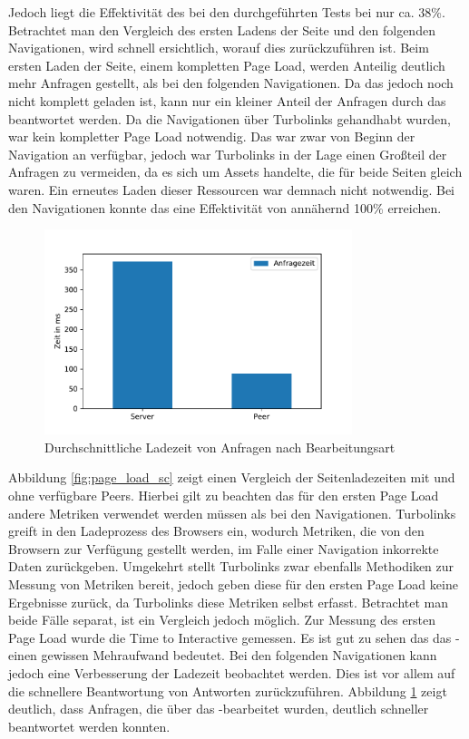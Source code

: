 Jedoch liegt die Effektivität des \cdn bei den durchgeführten Tests bei nur ca. 38\%. Betrachtet man den Vergleich des ersten Ladens der Seite und den folgenden Navigationen, wird schnell ersichtlich, worauf dies zurückzuführen ist. Beim ersten Laden der Seite, einem kompletten Page Load, werden Anteilig deutlich mehr Anfragen gestellt, als bei den folgenden Navigationen. Da das \cdn jedoch noch nicht komplett geladen ist, kann nur ein kleiner Anteil der Anfragen durch das \cdn beantwortet werden. Da die Navigationen über Turbolinks gehandhabt wurden, war kein kompletter Page Load notwendig. Das \cdn war zwar von Beginn der Navigation an verfügbar, jedoch war Turbolinks in der Lage einen Großteil der Anfragen zu vermeiden, da es sich um Assets handelte, die für beide Seiten gleich waren. Ein erneutes Laden dieser Ressourcen war demnach nicht notwendig. Bei den Navigationen konnte das \cdn eine Effektivität von annähernd 100\% erreichen. 

\begin{figure}[!h]
	\centering
	\includegraphics[width=0.8\textwidth]{figures/request_load}
	\caption[Durchschnittliche Ladezeit von Anfragen nach Bearbeitungsart]{Durchschnittliche Ladezeit von Anfragen nach Bearbeitungsart}
	\label{fig:request_load}
\end{figure}

Abbildung \ref{fig:page_load_sc} zeigt einen Vergleich der Seitenladezeiten mit und ohne verfügbare Peers. Hierbei gilt zu beachten das für den ersten Page Load andere Metriken verwendet werden müssen als bei den Navigationen. Turbolinks greift in den Ladeprozess des Browsers ein, wodurch Metriken, die von den Browsern zur Verfügung gestellt werden, im Falle einer Navigation inkorrekte Daten zurückgeben. Umgekehrt stellt Turbolinks zwar ebenfalls Methodiken zur Messung von Metriken bereit, jedoch geben diese für den ersten Page Load keine Ergebnisse zurück, da Turbolinks diese Metriken selbst erfasst. Betrachtet man beide Fälle separat, ist ein Vergleich jedoch möglich. Zur Messung des ersten Page Load wurde die Time to Interactive gemessen. Es ist gut zu sehen das das \pTp-\cdn einen gewissen Mehraufwand bedeutet. Bei den folgenden Navigationen kann jedoch eine Verbesserung der Ladezeit beobachtet werden. Dies ist vor allem auf die schnellere Beantwortung von Antworten zurückzuführen. Abbildung \ref{fig:request_load} zeigt deutlich, dass Anfragen, die über das \pTp-\cdn bearbeitet wurden, deutlich schneller beantwortet werden konnten.
 


